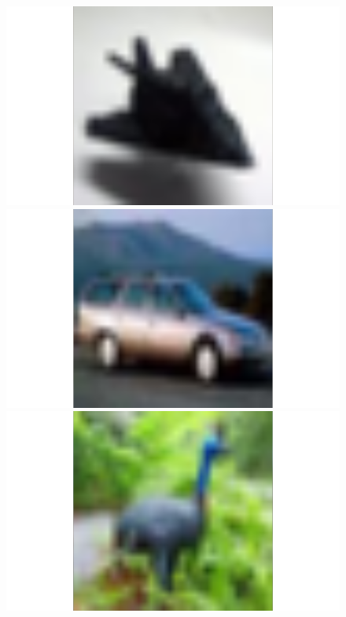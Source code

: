 \begin{figure}
 \begin{minipage}{0.19\textwidth}
  \includegraphics[width=1.5\textwidth]{../plots/cifar10-class0}
 \end{minipage}
 \begin{minipage}{0.19\textwidth}
  \includegraphics[width=1.5\textwidth]{../plots/cifar10-class1}
 \end{minipage}
 \begin{minipage}{0.19\textwidth}
  \includegraphics[width=1.5\textwidth]{../plots/cifar10-class2}

\end{minipage}
\end{figure}
